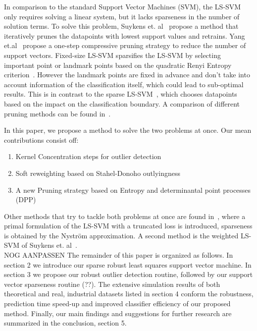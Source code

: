 \documentclass[preprint,12pt]{elsarticle}
\begin{document}
In comparison to the standard Support Vector Machines (SVM), the LS-SVM only requires solving a linear system, but it lacks sparseness in the number of solution terms. To solve this problem, Suykens et. al~\cite{suykens2000sparse} propose a method that iteratively prunes the datapoints with lowest support values and retrains. Yang et.al~\cite{yang2014sparse} propose a one-step compressive pruning strategy to reduce the number of support vectors. Fixed-size LS-SVM sparsifies the LS-SVM by selecting important point or landmark points based on the quadratic Renyi Entropy criterion~\cite{suykens2002least}. However the landmark points are fixed in advance and don't take into account information of the classification itself, which could lead to sub-optimal results. This is in contrast to the sparse LS-SVM~\cite{suykens2000sparse}, which chooses datapoints based on the impact on the classification boundary. A comparison of different pruning methods can be found in~\cite{hoegaerts2004comparison}. 

In this paper, we propose a method to solve the two problems at once.
Our mean contributions consist off:
\begin{enumerate}
	\item Kernel Concentration steps for outlier detection
	\item Soft reweighting based on Stahel-Donoho outlyingness
	\item A new Pruning strategy based on Entropy and determinantal point processes (DPP)
\end{enumerate}

Other methods that try to tackle both problems at once are found in~\cite{chen2018sparse}, where a primal formulation of the LS-SVM with a truncated loss is introduced, sparseness is obtained by the Nystr\"{o}m approximation. A second method is the weighted LS-SVM of Suykens et. al~\cite{suykens2002weighted}. \\


NOG AANPASSEN
The remainder of this paper is organized as follows. In section 2 we introduce our sparse robust least squares support vector machine. In section 3 we propose our robust outlier detection routine, followed by our support vector sparseness routine (??). The extensive simulation results of both theoretical and real, industrial datasets listed in section 4 conform the robustness, prediction time speed-up and improved classifier efficiency of our proposed method. Finally, our main findings and suggestions for further research are summarized in the conclusion, section 5. 
\end{document}
